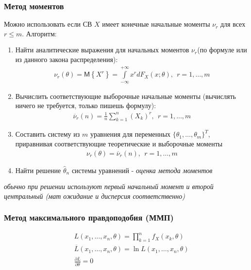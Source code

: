 \documentclass[12pt]{article}
\newcommand{\M}{\mathsf{M}}
\begin{document}
\subsubsection{Метод моментов}
Можно использовать если СВ $X$ имеет конечные начальные моменты
$\nu_{r}$ для всех $r\leqslant m$. Алгоритм:
\begin{enumerate}
    \itemsep0em
    \item Найти аналитические выражения для начальных моментов
        $\nu_{r}$(по формуле или из данного закона распределения):
        \begin{eqnarray*}
            \nu_{r}(\theta)
            =\M\left\{X^{r}\right\}
            =\int\limits_{-\infty}^{+\infty}x^{r}dF_{X}(x;\theta)
            ,\ \ r=1,\ldots,m
        \end{eqnarray*}
    \item Вычислить соответствующие выборочные начальные моменты
        (вычислять ничего не требуется, только пишешь формулу):
        \begin{eqnarray*}
            \overline{\nu}_{r}(n)
            =\frac{1}{n}\sum\limits_{k=1}^{n}(X_{k})^{r},\ \ r=1,\ldots,m
        \end{eqnarray*}
    \item Составить систему из $m$ уравнения для переменных
        $\{\theta_{1},\ldots,\theta_{m}\}^{T}$, приравнивая
        соответствующие теоретические и выборочные моменты
        \begin{eqnarray*}
            \nu_{r}(\theta)=\overline{\nu}_{r}(n)
            ,\ \ r=1,\ldots,m
        \end{eqnarray*}
    \item Найти решение $\widehat{\theta}_{n}$ системы уравнений -
        \textit{оценка метода моментов}
\end{enumerate}
\textit{обычно при решении используют первый начальный момент и второй
центральный (мат ожидание и дисперсия соответственно)}

\subsubsection{Метод максимального правдоподобия (ММП)}

\begin{eqnarray*}
    &&L(x_{1},\ldots,x_{n},\theta)=\prod_{k=1}^{n}f_{X}(x_{k},\theta)\\
    &&\overline{L}(x_{1},\ldots,x_{n},\theta)=\ln L(x_{1},\ldots,x_{n},\theta)\\
    &&\frac{\partial \overline{L}}{\partial\theta}=0
\end{eqnarray*}
\end{document}
